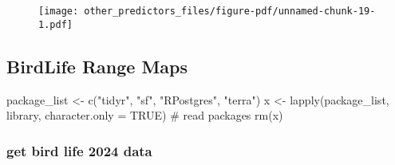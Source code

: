 \documentclass[
  letterpaper,
  DIV=11,
  numbers=noendperiod]{scrreprt}
\newenvironment{Shaded}{\begin{snugshade}}{\end{snugshade}}
\newcommand{\AttributeTok}[1]{\textcolor[rgb]{0.40,0.45,0.13}{#1}}
\newcommand{\CommentTok}[1]{\textcolor[rgb]{0.37,0.37,0.37}{#1}}
\newcommand{\ConstantTok}[1]{\textcolor[rgb]{0.56,0.35,0.01}{#1}}
\newcommand{\FunctionTok}[1]{\textcolor[rgb]{0.28,0.35,0.67}{#1}}
\newcommand{\NormalTok}[1]{\textcolor[rgb]{0.00,0.23,0.31}{#1}}
\newcommand{\OtherTok}[1]{\textcolor[rgb]{0.00,0.23,0.31}{#1}}
\newcommand{\StringTok}[1]{\textcolor[rgb]{0.13,0.47,0.30}{#1}}
\begin{document}
\begin{figure}[H]

{\centering \texttt{[image: other\_predictors\_files/figure-pdf/unnamed-chunk-19-1.pdf]}

}

\end{figure}

\hypertarget{birdlife-range-maps}{%
\subsection{BirdLife Range Maps}\label{birdlife-range-maps}}

\begin{Shaded}
\begin{Highlighting}[]
\NormalTok{package\_list }\OtherTok{\textless{}{-}} \FunctionTok{c}\NormalTok{(}\StringTok{"tidyr"}\NormalTok{, }\StringTok{"sf"}\NormalTok{, }\StringTok{"RPostgres"}\NormalTok{, }\StringTok{"terra"}\NormalTok{)}
\NormalTok{x }\OtherTok{\textless{}{-}} \FunctionTok{lapply}\NormalTok{(package\_list, library, }\AttributeTok{character.only =} \ConstantTok{TRUE}\NormalTok{) }\CommentTok{\# read packages}
\FunctionTok{rm}\NormalTok{(x)}
\end{Highlighting}
\end{Shaded}

\hypertarget{get-bird-life-2024-data}{%
\subsubsection{get bird life 2024 data}\label{get-bird-life-2024-data}}
\end{document}

